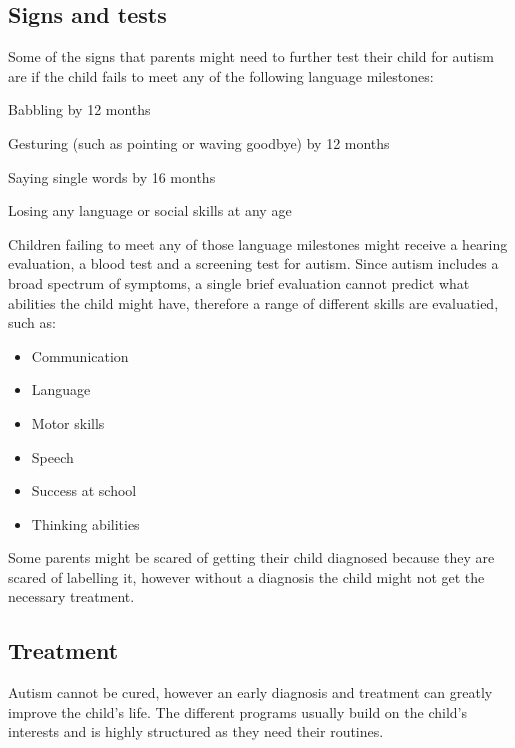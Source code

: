 \subsection*{Signs and tests}

Some of the signs that parents might need to further test their child for autism are if the child fails to meet any of the following language milestones:

\begin{description}
\item Babbling by 12 months
\item Gesturing (such as pointing or waving goodbye) by 12 months
\item Saying single words by 16 months
\item Losing any language or social skills at any age
\end{description}

Children failing to meet any of those language milestones might receive a hearing evaluation, a blood test and a screening test for autism. Since autism includes a broad spectrum of symptoms, a single brief evaluation cannot predict what abilities the child might have, therefore a range of different skills are evaluatied, such as:

\begin{itemize}
\item Communication
\item Language
\item Motor skills
\item Speech
\item Success at school
\item Thinking abilities
\end{itemize}

Some parents might be scared of getting their child diagnosed because they are scared of labelling it, however without a diagnosis the child might not get the necessary treatment.\citep{autism} 

\subsection*{Treatment}

Autism cannot be cured, however an early diagnosis and treatment can greatly improve the child's life. The different programs usually build on the child's interests and is highly structured as they need their routines.\citep{autism}